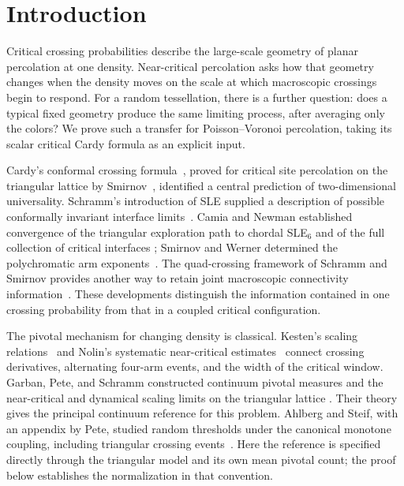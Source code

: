 \section{Introduction}
\label{sec:introduction}

Critical crossing probabilities describe the large-scale geometry of
planar percolation at one density. Near-critical percolation asks how
that geometry changes when the density moves on the scale at which
macroscopic crossings begin to respond. For a random tessellation,
there is a further question: does a typical fixed geometry produce
the same limiting process, after averaging only the colors?
We prove such a transfer for Poisson--Voronoi percolation, taking its
scalar critical Cardy formula as an explicit input.

Cardy's conformal crossing formula~\cite{cardy92}, proved for critical
site percolation on the triangular lattice by Smirnov~\cite{smirnov01},
identified a central prediction of two-dimensional universality.
Schramm's introduction of SLE supplied a description of possible
conformally invariant interface limits~\cite{schramm00}. Camia and
Newman established convergence of the triangular exploration path
to chordal SLE$_6$ and of the full collection of critical interfaces
\cite{cnexploration,cnloops}; Smirnov and Werner determined the
polychromatic arm exponents~\cite{smirnovwerner01}. The quad-crossing
framework of Schramm and Smirnov provides another way to retain joint
macroscopic connectivity information~\cite{schrammsmirnov11}.
These developments distinguish the information contained in one
crossing probability from that in a coupled critical configuration.

The pivotal mechanism for changing density is classical. Kesten's
scaling relations~\cite{kesten87} and Nolin's systematic near-critical
estimates~\cite{nolin08} connect crossing derivatives, alternating
four-arm events, and the width of the critical window. Garban, Pete,
and Schramm constructed continuum pivotal measures and the near-critical
and dynamical scaling limits on the triangular lattice
\cite{garbanpete-schramm-pivotal,garbanpete-schramm-nearcritical}.
Their theory gives the principal continuum reference for this problem.
Ahlberg and Steif, with an appendix by Pete, studied random thresholds
under the canonical monotone coupling, including triangular crossing
events~\cite{ahlbergsteif17}.
Here the reference is specified directly through the triangular model
and its own mean pivotal count; the proof below establishes the
normalization in that convention.

